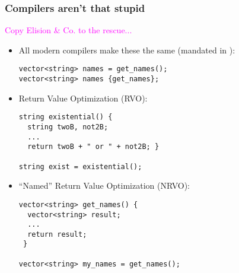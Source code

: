 \begin{frame}[fragile,t]
\frametitle{Compilers aren't that stupid}

{\textcolor{magenta}{Copy Elision \& Co. to the rescue...}}

\begin{itemize}
\item<2-> All modern compilers make these the same (mandated in  ):
{\scriptsize
\begin{verbatim}
vector<string> names = get_names();
vector<string> names {get_names};
\end{verbatim}}

\vskip 6pt

\item<3->Return Value Optimization (RVO):{\scriptsize
\begin{verbatim}
string existential() {
  string twoB, not2B;
  ...
  return twoB + " or " + not2B; } 

string exist = existential();
\end{verbatim}}
\vskip 6pt
\item<4->``Named'' Return Value Optimization (NRVO):{\scriptsize
\begin{verbatim}
vector<string> get_names() {
  vector<string> result; 
  ... 
  return result;
 } 

vector<string> my_names = get_names();
\end{verbatim}}

\vskip 6pt


\end{itemize}


\end{frame}

